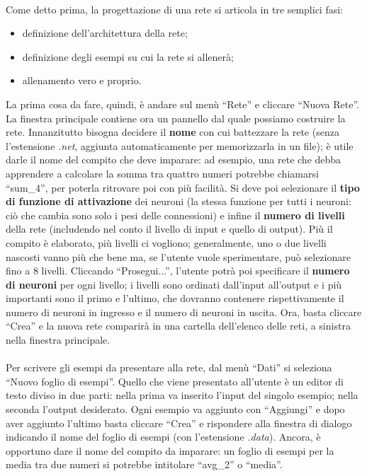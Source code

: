 \documentclass{article}
\begin{document}
\paragraph{} Come detto prima, la progettazione di una rete si articola in tre semplici fasi:
\begin{itemize}
	\item definizione dell'architettura della rete;
	\item definizione degli esempi su cui la rete si allenerà;
	\item allenamento vero e proprio.
\end{itemize}
La prima cosa da fare, quindi, è andare sul menù “Rete” e cliccare “Nuova Rete”. La finestra principale contiene ora un pannello dal quale possiamo costruire la rete. Innanzitutto bisogna decidere il \textbf{nome} con cui battezzare la rete (senza l'estensione \textit{.net}, aggiunta automaticamente per memorizzarla in un file); è utile darle il nome del compito che deve imparare: ad esempio, una rete che debba apprendere a calcolare la somma tra quattro numeri potrebbe chiamarsi “sum\_4”, per poterla ritrovare poi con più facilità. Si deve poi selezionare il \textbf{tipo di funzione di attivazione} dei neuroni (la stessa funzione per tutti i neuroni: ciò che cambia sono solo i pesi delle connessioni) e infine il \textbf{numero di livelli} della rete (includendo nel conto il livello di input e quello di output). Più il compito è elaborato, più livelli ci vogliono; generalmente, uno o due livelli nascosti vanno più che bene ma, se l'utente vuole sperimentare, può selezionare fino a 8 livelli. Cliccando “Prosegui...”, l'utente potrà poi specificare il \textbf{numero di neuroni} per ogni livello; i livelli sono ordinati dall'input all'output e i più importanti sono il primo e l'ultimo, che dovranno contenere rispettivamente il numero di neuroni in ingresso e il numero di neuroni in uscita. Ora, basta cliccare “Crea” e la nuova rete comparirà in una cartella dell'elenco delle reti, a sinistra nella finestra principale.

\paragraph{} Per scrivere gli esempi da presentare alla rete, dal menù “Dati” si seleziona “Nuovo foglio di esempi”. Quello che viene presentato all'utente è un editor di testo diviso in due parti: nella prima va inserito l'input del singolo esempio; nella seconda l'output desiderato. Ogni esempio va aggiunto con “Aggiungi” e dopo aver aggiunto l'ultimo basta cliccare “Crea” e rispondere alla finestra di dialogo indicando il nome del foglio di esempi (con l'estensione \textit{.data}). Ancora, è opportuno dare il nome del compito da imparare: un foglio di esempi per la media tra due numeri si potrebbe intitolare “avg\_2” o “media”.
\end{document}
